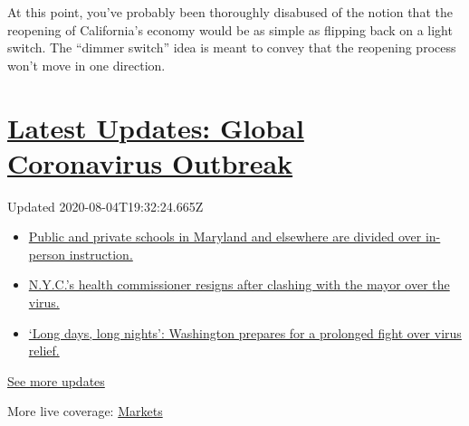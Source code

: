 At this point, you've probably been thoroughly disabused of the notion
that the reopening of California's economy would be as simple as
flipping back on a light switch. The ``dimmer switch'' idea is meant to
convey that the reopening process won't move in one direction.

\hypertarget{latest-updates-global-coronavirus-outbreak}{%
\section{\texorpdfstring{\href{https://www.nytimes3xbfgragh.onion/2020/08/04/world/coronavirus-cases.html?action=click\&pgtype=Article\&state=default\&region=MAIN_CONTENT_1\&context=storylines_live_updates}{Latest
Updates: Global Coronavirus
Outbreak}}{Latest Updates: Global Coronavirus Outbreak}}\label{latest-updates-global-coronavirus-outbreak}}

Updated 2020-08-04T19:32:24.665Z

\begin{itemize}
\tightlist
\item
  \href{https://www.nytimes3xbfgragh.onion/2020/08/04/world/coronavirus-cases.html?action=click\&pgtype=Article\&state=default\&region=MAIN_CONTENT_1\&context=storylines_live_updates\#link-4825b93}{Public
  and private schools in Maryland and elsewhere are divided over
  in-person instruction.}
\item
  \href{https://www.nytimes3xbfgragh.onion/2020/08/04/world/coronavirus-cases.html?action=click\&pgtype=Article\&state=default\&region=MAIN_CONTENT_1\&context=storylines_live_updates\#link-4d1eafa8}{N.Y.C.'s
  health commissioner resigns after clashing with the mayor over the
  virus.}
\item
  \href{https://www.nytimes3xbfgragh.onion/2020/08/04/world/coronavirus-cases.html?action=click\&pgtype=Article\&state=default\&region=MAIN_CONTENT_1\&context=storylines_live_updates\#link-6b644638}{`Long
  days, long nights': Washington prepares for a prolonged fight over
  virus relief.}
\end{itemize}

\href{https://www.nytimes3xbfgragh.onion/2020/08/04/world/coronavirus-cases.html?action=click\&pgtype=Article\&state=default\&region=MAIN_CONTENT_1\&context=storylines_live_updates}{See
more updates}

More live coverage:
\href{https://www.nytimes3xbfgragh.onion/live/2020/08/04/business/stock-market-today-coronavirus?action=click\&pgtype=Article\&state=default\&region=MAIN_CONTENT_1\&context=storylines_live_updates}{Markets}

